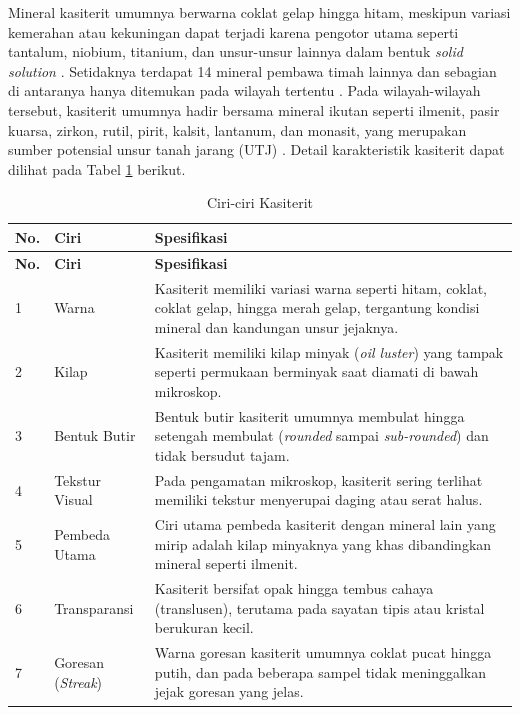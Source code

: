 Mineral kasiterit umumnya berwarna coklat gelap hingga hitam, meskipun variasi kemerahan atau kekuningan dapat terjadi karena pengotor utama seperti tantalum, niobium, titanium, dan unsur-unsur lainnya dalam bentuk \textit{solid solution} \cite{IrzonTimahIndonesia12} \cite{bookTin}. Setidaknya terdapat 14 mineral pembawa timah lainnya dan sebagian di antaranya hanya ditemukan pada wilayah tertentu \cite{IrzonTimahIndonesia12}. Pada wilayah-wilayah tersebut, kasiterit umumnya hadir bersama mineral ikutan seperti ilmenit, pasir kuarsa, zirkon, rutil, pirit, kalsit, lantanum, dan monasit, yang merupakan sumber potensial unsur tanah jarang (UTJ) \cite{PurificationCassiterite4} \cite{IrzonTimahIndonesia12}. Detail karakteristik kasiterit dapat dilihat pada Tabel \ref{table:ciri2-kasiterit} berikut. \par

\begin{longtable}{|p{}|p{}|p{}|}
\caption{Ciri-ciri Kasiterit}
\label{table:ciri2-kasiterit} \\
\hline
\centering\textbf{No.} & \centering\textbf{Ciri} & \centering\arraybackslash\textbf{Spesifikasi} \\
\hline
\endfirsthead

\hline
\centering\textbf{No.} & \centering\textbf{Ciri} & \centering\arraybackslash\textbf{Spesifikasi} \\
\hline
\endhead

1 &
Warna &
Kasiterit memiliki variasi warna seperti hitam, coklat, coklat gelap, hingga merah gelap, tergantung kondisi mineral dan kandungan unsur jejaknya. \\
\hline

2 &
Kilap &
Kasiterit memiliki kilap minyak (\textit{oil luster}) yang tampak seperti permukaan berminyak saat diamati di bawah mikroskop. \\
\hline

3 &
Bentuk Butir &
Bentuk butir kasiterit umumnya membulat hingga setengah membulat (\textit{rounded} sampai \textit{sub-rounded}) dan tidak bersudut tajam. \\
\hline

4 &
Tekstur Visual &
Pada pengamatan mikroskop, kasiterit sering terlihat memiliki tekstur menyerupai daging atau serat halus. \\
\hline

5 &
Pembeda Utama &
Ciri utama pembeda kasiterit dengan mineral lain yang mirip adalah kilap minyaknya yang khas dibandingkan mineral seperti ilmenit. \\
\hline

6 &
Transparansi &
Kasiterit bersifat opak hingga tembus cahaya (translusen), terutama pada sayatan tipis atau kristal berukuran kecil. \\
\hline

7 &
Goresan (\textit{Streak}) &
Warna goresan kasiterit umumnya coklat pucat hingga putih, dan pada beberapa sampel tidak meninggalkan jejak goresan yang jelas. \\
\hline

\end{longtable}

